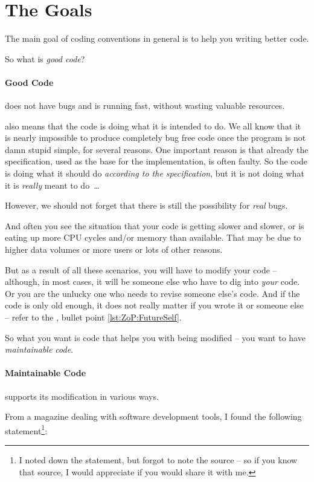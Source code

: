 \section{The Goals}\label{sec:Goals}
The main goal of coding conventions in general is to help you writing better code.

So what is \textit{good code}?

\paragraph{Good Code} does not have bugs and is running fast, without wasting valuable resources.

 also means that the code is doing what it is intended to do. We all know that it is nearly impossible to produce completely bug free code once the program is not damn stupid simple, for several reasons. One important reason is that already the specification, used as the base for the implementation, is often faulty. So the code is doing what it should do \textit{according to the specification}, but it is not doing what it is \textit{really} meant to do~…

However, we should not forget that there is still the possibility for \textit{real} bugs.

And often you see the situation that your code is getting slower and slower, or is eating up more CPU cycles and/or memory than available. That may be due to higher data volumes or more users or lots of other reasons.

But as a result of all these scenarios, you will have to modify your code – although, in most cases, it will be someone else who have to dig into \textit{your} code.  Or you are the unlucky one who needs to revise someone else's code. And if the code is only old enough, it does not really matter if you wrote it or someone else – refer to the \ngref, bullet point \ref{lst:ZoP:FutureSelf}.

So what you want is code that helps you with being modified – you want to have \textit{maintainable code}.

\paragraph{Maintainable Code} supports its modification in various ways.

From a magazine dealing with software development tools, I found the following statement\footnote{I noted down the statement, but forgot to note the source – so if you know that source, I would appreciate if you would share it with me.}:


